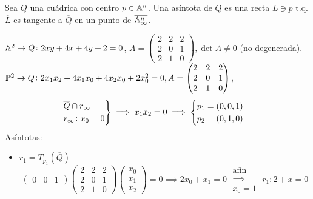 \begin{defi}
  Sea $Q$ una cuádrica con centro $p\in\mathbb{A}^n$. Una asíntota de $Q$ es una recta $L \ni p$ t.q. $\overline{L}$ es tangente a $\overline{Q}$ en un punto de $\overline{\mathbb{A}^n_\infty}$.
\end{defi}
\begin{example}
  $\mathbb{A}^2 \to Q \colon 2xy + 4x +4y +2 = 0$,
  $A = \left( \begin{array}{c|cc}
    2 & 2 & 2 \\ \hline
    2 & 0 & 1 \\
    2 & 1 & 0
  \end{array} \right), \det A \neq 0$ (no degenerada). \\
  $\mathbb{P}^2 \to Q \colon 2x_1x_2 + 4x_1x_0 + 4x_2x_0 + 2x_0^2 = 0,
  A = \begin{pmatrix}
    2 & 2 & 2 \\
    2 & 0 & 1 \\
    2 & 1 & 0
  \end{pmatrix}$,
  \begin{gather*}
    \begin{rcases}
      \overline{Q} \cap r_\infty \\
      r_\infty \colon x_0 = 0
    \end{rcases}
    \implies x_1x_2 = 0 \implies
    \begin{cases}
      p_1 = \left( 0,0,1 \right) \\
      p_2 = \left( 0,1,0 \right)
    \end{cases}
  \end{gather*}
  Asíntotas:
  \begin{itemize}
    \item $\overline{r}_1 = T_{p_1}\left( \overline{Q} \right)$
      \[
        \begin{pmatrix}
          0 & 0 & 1
        \end{pmatrix}
        \begin{pmatrix}
          2 & 2 & 2 \\
          2 & 0 & 1 \\
          2 & 1 & 0
        \end{pmatrix}
        \begin{pmatrix}
          x_0 \\ x_1 \\ x_2
        \end{pmatrix}
        = 0 \implies 2x_0 + x_1 = 0 \;\substack{\text{afín} \\ \implies \\ x_0 = 1}\; r_1 \colon 2 + x = 0
\]
\end{itemize}
\end{example}
